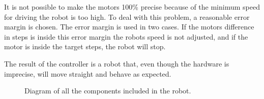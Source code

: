 It is not possible to make the motors 100\% precise because of the minimum speed for driving the robot is too high. To deal with this problem, a reasonable error margin is chosen. The error margin is used in two cases. If the motors difference in steps is inside this error margin the robots speed is not adjusted, and if the motor is inside the target steps, the robot will stop.  

The result of the controller is a robot that, even though the hardware is imprecise, will move straight and behave as expected. 

\begin{figure}[H]
     \caption{\label{fig:robot_overview} Diagram of all the components included in the robot.}
\end{figure}

